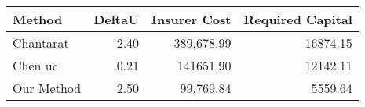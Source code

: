 \begin{tabular}{lrrr}
\toprule
Method & DeltaU & Insurer Cost & Required Capital \\
\midrule
Chantarat & 2.40 & 389,678.99 & 16874.15 \\
Chen uc & 0.21 & 141651.90 & 12142.11 \\
Our Method & 2.50 & 99,769.84 & 5559.64 \\
\bottomrule
\end{tabular}
